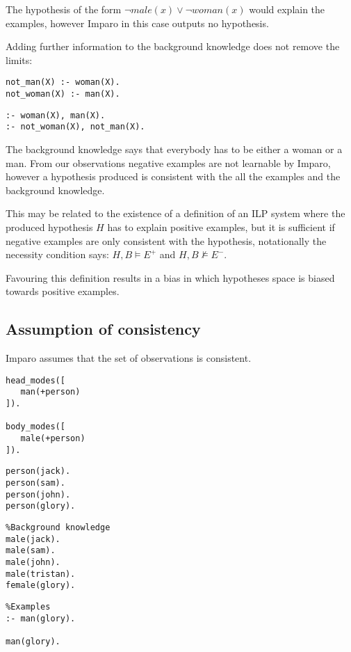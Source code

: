 The hypothesis of the form $\neg male(x) \vee \neg woman(x)$ would explain the examples, however Imparo in this case outputs no hypothesis.

Adding further information to the background knowledge does not remove the limits:

\begin{minipage}[t]{.45\textwidth}
\begin{lstlisting}
not_man(X) :- woman(X).
not_woman(X) :- man(X).
\end{lstlisting}
\end{minipage}
\begin{minipage}[t]{.20\textwidth}
\begin{lstlisting}
:- woman(X), man(X).
:- not_woman(X), not_man(X).
\end{lstlisting}
\end{minipage}

The background knowledge says that everybody has to be either a woman or a man. From our observations negative examples are not learnable by Imparo, however a hypothesis produced is consistent with the all the examples and the background knowledge.

This may be related to the existence of a definition of an ILP system where the produced hypothesis $H$ has to explain positive examples, but it is sufficient if negative examples are only consistent with the hypothesis, notationally the necessity condition says:
$H, B \models E^+$ and $H, B \not \models E^-$.

Favouring this definition results in a bias in which hypotheses space is biased towards positive examples.

\subsection{Assumption of consistency}
Imparo assumes that the set of observations is consistent.

\begin{minipage}[t]{.25\textwidth}
\begin{lstlisting}
head_modes([
   man(+person)
]).

body_modes([
   male(+person)
]).\end{lstlisting}
\end{minipage}
\begin{minipage}[t]{.20\textwidth}
\begin{lstlisting}
person(jack).
person(sam).
person(john).
person(glory).
\end{lstlisting}
\end{minipage}
\begin{minipage}[t]{.30\textwidth}
\begin{lstlisting}
%Background knowledge
male(jack).
male(sam).
male(john).
male(tristan).
female(glory).
\end{lstlisting}
\end{minipage}
\begin{minipage}[t]{.25\textwidth}
\begin{lstlisting}
%Examples
:- man(glory).

man(glory).
\end{lstlisting}
\end{minipage}

